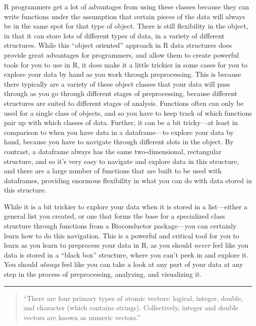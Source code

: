 \documentclass[]{tufte-book}
\begin{document}
R programmers get a lot of advantages from using these classes because they can
write functions under the assumption that certain pieces of the data will always
be in the same spot for that type of object. There is still flexibility in the
object, in that it can store lots of different types of data, in a variety of
different structures. While this ``object oriented'' approach in R data structures
does provide great advantages for programmers, and allow them to create powerful
tools for you to use in R, it does make it a little trickier in some cases for
you to explore your data by hand as you work through preprocessing. This is
because there typically are a variety of these object classes that your data
will pass through as you go through different stages of preprocessing, because
different structures are suited to different stages of analysis. Functions often
can only be used for a single class of objects, and so you have to keep track of
which functions pair up with which classes of data. Further, it can be a bit
tricky---at least in comparison to when you have data in a dataframe---to
explore your data by hand, because you have to navigate through different slots
in the object. By contrast, a dataframe always has the same two-dimensional,
rectangular structure, and so it's very easy to navigate and explore data in
this structure, and there are a large number of functions that are built to be
used with dataframes, providing enormous flexibility in what you can do with
data stored in this structure.

While it is a bit trickier to explore your data when it is stored in a
list---either a general list you created, or one that forms the base for a
specialized class structure through functions from a Bioconductor package---you
can certainly learn how to do this navigation. This is a powerful and critical
tool for you to learn as you learn to preprocess your data in R, as you should
\emph{never} feel like you data is stored in a ``black box'' structure, where you can't
peek in and explore it. You should \emph{always} feel like you can take a look at any
part of your data at any step in the process of preprocessing, analyzing, and
visualizing it.

\begin{center}\rule{0.5\linewidth}{0.5pt}\end{center}

\begin{quote}
``There are four primary types of atomic vectors: logical, integer, double,
and character (which contains strings). Collectively, integer and double
vectors are known as numeric vectors.'' \citep{wickham2019advanced}
\end{quote}
\end{document}
